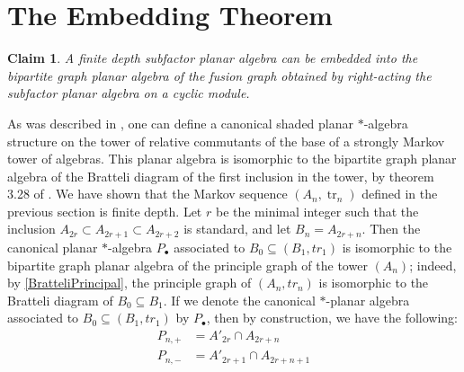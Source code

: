 \documentclass[11pt]{article}
\theoremstyle{plain}
\newtheorem*{claim*}{Claim}
\theoremstyle{definition}
\DeclareMathOperator{\tr}{tr}
\begin{document}
\section{The Embedding Theorem}

\begin{claim*}
A finite depth subfactor planar algebra can be embedded into the bipartite graph planar algebra of the fusion graph obtained by right-acting the subfactor planar algebra on a cyclic module.
\end{claim*}
As was described in \cite{penneys}, one can define a canonical shaded planar $*$-algebra structure on the tower of relative commutants of the base of a strongly Markov tower of algebras. This planar algebra is isomorphic to the bipartite graph planar algebra of the Bratteli diagram of the first inclusion in the tower, by theorem 3.28 of \cite{penneys}. We have shown that the Markov sequence $(A_n,\tr_n)$ defined in the previous section is finite depth. Let $r$ be the minimal integer such that the inclusion $A_{2r} \subset A_{2r+1} \subset A_{2r+2}$ is standard, and let $B_n=A_{2r+n}$. Then the canonical planar $*$-algebra $P_\bullet$ associated to $B_0\subseteq (B_1,tr_1)$ is isomorphic to the bipartite graph planar algebra of the principle graph of the tower $\left(A_{n}\right)$; indeed, by \ref{BratteliPrincipal}, the principle graph of $(A_{n},tr_n)$ is isomorphic to the Bratteli diagram of $B_0\subseteq B_1$.
If we denote the canonical $*$-planar algebra associated to $B_0\subseteq(B_1,tr_1)$ by $P_{\bullet}$, then by construction, we have the following:
\begin{align*}
	P_{n,+} &=  A'_{2r}\cap A_{2r+n} \\
	P_{n,-}  &= A'_{2r+1}\cap A_{2r+n+1} 
\end{align*}
\end{document}
